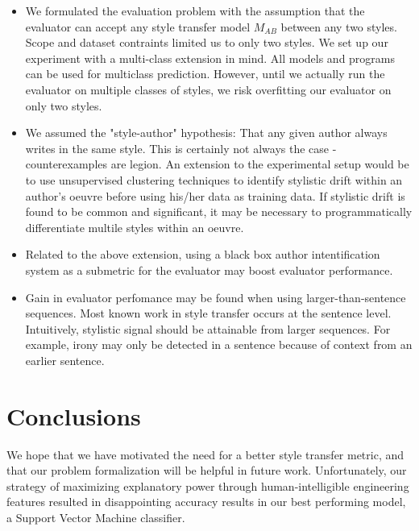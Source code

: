 \documentclass[letterpaper, 10 pt, conference]{ieeeconf}  %
\begin{document}
\begin{itemize}
  \item We formulated the evaluation problem with the assumption that the evaluator can accept any style transfer model $M_{AB}$ between any two styles. Scope and dataset contraints limited us to only two styles. We set up our experiment with a multi-class extension in mind. All models and programs can be used for multiclass prediction. However, until we actually run the evaluator on multiple classes of styles, we risk overfitting our evaluator on only two styles. \\
  \item
  We assumed the "style-author" hypothesis: That any given author always writes in the same style. This is certainly not always the case - counterexamples are legion. An extension to the experimental setup would be to use unsupervised clustering techniques to identify stylistic drift within an author's oeuvre before using his/her data as training data. If stylistic drift is found to be common and significant, it may be necessary to programmatically differentiate multile styles within an oeuvre.\\
  \item 
  Related to the above extension, using a black box author intentification system as a submetric for the evaluator may boost evaluator performance.\\
  \item Gain in evaluator perfomance may be found when using larger-than-sentence sequences. Most known work in style transfer occurs at the sentence level. Intuitively, stylistic signal should be attainable from larger sequences. For example, irony may only be detected in a sentence because of context from an earlier sentence.
\end{itemize}

\section{Conclusions}
We hope that we have motivated the need for a better style transfer metric, and that our problem formalization will be helpful in future work. Unfortunately, our strategy of maximizing explanatory power through human-intelligible engineering features resulted in disappointing accuracy results in our best performing model, a Support Vector Machine classifier.



\addtolength{\textheight}{-12cm}   %
\end{document}

